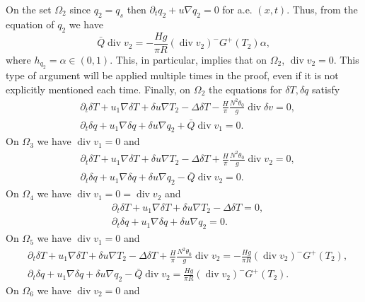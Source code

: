 \documentclass[11pt, a4paper, article,reqno,]{amsart}
\theoremstyle{remark}
\DeclareMathOperator{\dive}{div}
\numberwithin{equation}{section}
\begin{document}
On the set $\Omega_2$ since $q_2=q_s$ then $\partial_t q_2 + u \nabla q_2=0$ for a.e. $(x,t)$. Thus, from the equation of $q_2$ we have
\begin{equation*}
    \bar{Q} \dive v_2 = - \frac{Hg}{\pi R}(\dive v_2)^- G^+(T_2)\alpha,
\end{equation*}
where $h_{q_2}=\alpha \in (0,1)$. This, in particular, implies that on $\Omega_2$,  $\dive v_2 = 0$. This type of argument will be applied multiple times in the proof, even if it is not explicitly mentioned each time. Finally, on $\Omega_2$ the equations for $\delta T, \delta q$ satisfy
\begin{equation}\label{delta_ome_2}
    \begin{aligned}
        & \partial_t \delta T + u_1 \nabla \delta T + \delta u \nabla T_{2} - \Delta \delta T - \frac{H}{\pi}\frac{N^2 \theta_0}{g} \dive  \delta v=0, \\
        & \partial_t \delta q + u_1 \nabla \delta q + \delta u \nabla q_2 + \bar{Q} \dive v_1 =0.
    \end{aligned}
\end{equation}
On $\Omega_3$ we have $\dive v_1=0$ and
\begin{equation}\label{delta_ome_3}
    \begin{aligned}
        & \partial_t \delta T + u_1 \nabla \delta T + \delta u \nabla T_{2} - \Delta \delta T + \frac{H}{\pi}\frac{N^2 \theta_0}{g} \dive v_2= 0, \\
        & \partial_t \delta q + u_1 \nabla \delta q + \delta u \nabla q_2 - \bar{Q} \dive v_2= 0.
    \end{aligned}
\end{equation}
On $\Omega_4$ we have $\dive v_1=0=\dive v_2$ and
\begin{equation}\label{delta_ome_4}
    \begin{aligned}
        & \partial_t \delta T + u_1 \nabla \delta T + \delta u \nabla T_{2} - \Delta \delta T = 0, \\
        & \partial_t \delta q + u_1 \nabla \delta q + \delta u \nabla q_2 = 0.
    \end{aligned}
\end{equation}
On $\Omega_5$ we have $\dive v_1=0$ and
\begin{equation}\label{delta_ome_5}
    \begin{aligned}
        & \partial_t \delta T + u_1 \nabla \delta T + \delta u \nabla T_{2} - \Delta \delta T + \frac{H}{\pi}\frac{N^2 \theta_0}{g} \dive v_2= -\frac{Hg}{\pi R}(\dive v_2)^-G^+(T_2), \\
        & \partial_t \delta q + u_1 \nabla \delta q + \delta u \nabla q_2 - \bar{Q} \dive v_2= \frac{Hg}{\pi R}(\dive v_2)^-G^+(T_2).
    \end{aligned}
\end{equation}
On $\Omega_6$ we have $\dive v_2=0$ and
\end{document}
